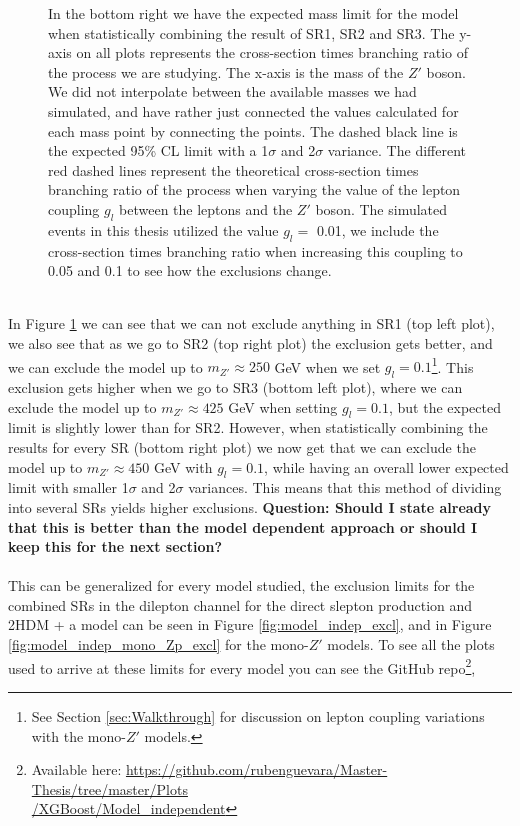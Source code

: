 \documentclass[12pt, a4paper]{book}
\begin{document}
\begin{figure}[!ht]
{   In the bottom right we have the expected mass limit for the model when statistically combining the result of SR1, SR2 and SR3. 
   The y-axis on all plots represents the cross-section times branching ratio of the process we are studying. The x-axis is the mass of the $Z'$ boson. We did not interpolate between the available masses we had simulated, 
   and have rather just connected the values calculated for each mass point by connecting the points. The dashed black line is the expected 95\% CL limit with a 1$\sigma$ and 2$\sigma$ variance. 
   The different red dashed lines represent the theoretical cross-section times branching ratio of the process when varying the value of the lepton coupling $g_l$ between the leptons and the $Z'$ boson. The simulated events in this thesis utilized the value $g_l=$ 0.01, we include the cross-section times branching ratio when increasing this coupling to 0.05 and 0.1 to see how the exclusions change. }\label{fig:DH_HDS_me_SRS}
\end{figure} 
\\In Figure \ref{fig:DH_HDS_me_SRS} we can see that we can not exclude anything in SR1 (top left plot), we also see that as we go to SR2 (top right plot) the exclusion gets better, and we can exclude the model up to $m_{Z'}\approx250$ GeV when we set $g_l=0.1$\footnote{See Section \ref{sec:Walkthrough} for discussion on lepton coupling variations with the mono-$Z'$ models.}. 
This exclusion gets higher when we go to SR3 (bottom left plot), where we can exclude the model up to $m_{Z'}\approx425$ GeV when setting $g_l=0.1$, but the expected limit is slightly lower than for SR2. However, when statistically combining the results for every SR (bottom right plot) we now get that we can exclude the model up to $m_{Z'}\approx450$ GeV with $g_l=0.1$,
while having an overall lower expected limit with smaller 1$\sigma$ and 2$\sigma$ variances. This means that this method of dividing into several SRs yields higher exclusions. \textbf{Question: Should I state already that this is better than the model dependent approach or should I keep this for the next section?}\\
\\ This can be generalized for every model studied, the exclusion limits for the combined SRs in the dilepton channel for the direct slepton production and 2HDM + a model can be seen in Figure \ref{fig:model_indep_excl}, and in Figure \ref{fig:model_indep_mono_Zp_excl} for the mono-$Z'$ models.
To see all the plots used to arrive at these limits for every model you can see the GitHub repo\footnote{Available here: \href{https://github.com/rubenguevara/Master-Thesis/tree/master/Plots/XGBoost/Model_independent}{https://github.com/rubenguevara/Master-Thesis/tree/master/Plots\\/XGBoost/Model\_independent}}, 
\end{document}
